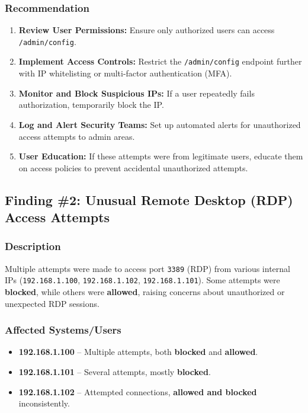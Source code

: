 \documentclass[11pt]{article}
\begin{document}
\subsubsection{Recommendation}
\begin{enumerate}
    \item \textbf{Review User Permissions:} Ensure only authorized users can access \texttt{/admin/config}.
    \item \textbf{Implement Access Controls:} Restrict the \texttt{/admin/config} endpoint further with IP whitelisting or multi-factor authentication (MFA).
    \item \textbf{Monitor and Block Suspicious IPs:} If a user repeatedly fails authorization, temporarily block the IP.
    \item \textbf{Log and Alert Security Teams:} Set up automated alerts for unauthorized access attempts to admin areas.
    \item \textbf{User Education:} If these attempts were from legitimate users, educate them on access policies to prevent accidental unauthorized attempts.
\end{enumerate}


\subsection{Finding \#2: Unusual Remote Desktop (RDP) Access Attempts}

\subsubsection{Description}
Multiple attempts were made to access port \texttt{3389} (RDP) from various internal IPs (\texttt{192.168.1.100}, \texttt{192.168.1.102}, \texttt{192.168.1.101}). Some attempts were \textbf{blocked}, while others were \textbf{allowed}, raising concerns about unauthorized or unexpected RDP sessions.

\subsubsection{Affected Systems/Users}
\begin{itemize}
    \item \textbf{192.168.1.100} – Multiple attempts, both \textbf{blocked} and \textbf{allowed}.
    \item \textbf{192.168.1.101} – Several attempts, mostly \textbf{blocked}.
    \item \textbf{192.168.1.102} – Attempted connections, \textbf{allowed and blocked} inconsistently.
\end{itemize}
\end{document}
